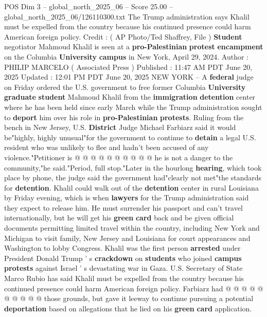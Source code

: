 \begin{textsample}{POS Dim 3 – global\_north\_2025\_06 – Score 25.00 – global\_north\_2025\_06/126110300.txt}  \label{ex:f3_pos_104}
The Trump administration says Khalil must be expelled from the country because his continued presence could harm American foreign policy.
Credit : ( AP Photo/Ted Shaffrey, File ) \textbf{Student} negotiator Mahmoud Khalil is seen at a \textbf{pro-Palestinian} \textbf{protest} \textbf{encampment} on the Columbia \textbf{University} \textbf{campus} in New York, April 29, 2024.
Author : PHILIP MARCELO ( Associated Press ) Published : 11:47 AM PDT June 20, 2025 Updated : 12:01 PM PDT June 20, 2025 NEW YORK -- A \textbf{federal} judge on Friday ordered the U.S. government to free former Columbia \textbf{University} \textbf{graduate} \textbf{student} Mahmoud Khalil from the \textbf{immigration} \textbf{detention} center where he has been held since early March while the Trump administration sought to \textbf{deport} him over his role in \textbf{pro-Palestinian} \textbf{protests}.
Ruling from the bench in New Jersey, U.S. \textbf{District} Judge Michael Farbiarz said it would be"highly, highly unusual"for the government to continue to \textbf{detain} a legal U.S. resident who was unlikely to flee and hadn't been accused of any violence."Petitioner is @ @ @ @ @ @ @ @ @ @ he is not a danger to the community,"he said."Period, full stop."Later in the hourlong \textbf{hearing}, which took place by phone, the judge said the government had"clearly not met"the standards for \textbf{detention}.
Khalil could walk out of the \textbf{detention} center in rural Louisiana by Friday evening, which is when \textbf{lawyers} for the Trump administration said they expect to release him.
He must surrender his passport and can't travel internationally, but he will get his \textbf{green} \textbf{card} back and be given official documents permitting limited travel within the country, including New York and Michigan to visit family, New Jersey and Louisiana for court appearances and Washington to lobby Congress.
Khalil was the first person \textbf{arrested} under President Donald Trump ' s \textbf{crackdown} on \textbf{students} who joined \textbf{campus} \textbf{protests} against Israel ' s devastating war in Gaza.
U.S.
Secretary of State Marco Rubio has said Khalil must be expelled from the country because his continued presence could harm American foreign policy.
Farbiarz had @ @ @ @ @ @ @ @ @ @ those grounds, but gave it leeway to continue pursuing a potential \textbf{deportation} based on allegations that he lied on his \textbf{green} \textbf{card} application.

\end{textsample}
